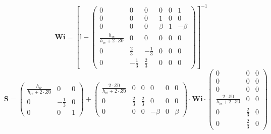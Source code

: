 \[ \mathbf{Wi} =  \left[ \mathbb{I}  - \left(\begin{smallmatrix} 0 & 0
& 0 & 0 & 0 & 1 \\ 0 & 0 & 0 & 1 & 0 & 0 \\ 0 & 0 & 0 & \beta & 1 &
-\beta \\ \frac{h_{ie}}{h_{ie}+2\cdot Z0} & 0 & 0 & 0 & 0 & 0 \\ 0 &
\frac{2}{3} & -\frac{1}{3} & 0 & 0 & 0 \\ 0 & -\frac{1}{3} &
\frac{2}{3} & 0 & 0 & 0 \end{smallmatrix}\right) \right]^{-1}  \]
\[ \mathbf{S} = \left(\begin{smallmatrix} \frac{h_{ie}}{h_{ie}+2\cdot
Z0} & 0 & 0 \\ 0 & -\frac{1}{3} & 0 \\ 0 & 0 & 1
\end{smallmatrix}\right) + \left(\begin{smallmatrix} \frac{2\cdot
Z0}{h_{ie}+2\cdot Z0} & 0 & 0 & 0 & 0 & 0 \\ 0 & \frac{2}{3} &
\frac{2}{3} & 0 & 0 & 0 \\ 0 & 0 & 0 & -\beta & 0 & \beta
\end{smallmatrix}\right) \cdot \mathbf{Wi}
\cdot\left(\begin{smallmatrix} 0 & 0 & 0 \\ 0 & 0 & 0 \\ 0 & 0 & 0 \\
\frac{2\cdot Z0}{h_{ie}+2\cdot Z0} & 0 & 0 \\ 0 & \frac{2}{3} & 0 \\ 0
& \frac{2}{3} & 0 \end{smallmatrix}\right) \]
